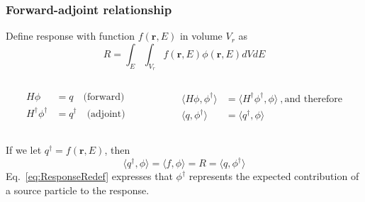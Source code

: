 \documentclass[xcolor=x11names,compress]{beamer}
\renewcommand{\(}{\begin{columns}}
\renewcommand{\)}{\end{columns}}
\newcommand{\<}[1]{\begin{column}{#1}}
\renewcommand{\>}{\end{column}}
\newcommand{\ve}[1]{\ensuremath{\mathbf{#1}}}
\begin{document}
\begin{frame}[fragile]
  \frametitle{Forward-adjoint relationship}
Define response with function $f(\ve{r}, E)$ in volume $V_r$ as
%
\begin{equation}
 R = \int_E \int_{V_r} f(\ve{r}, E) \phi(\ve{r}, E) dV dE 
 \label{eq:Response}
\end{equation}\pause
%
\begin{columns}
  \begin{column}{0.5\textwidth}
	\begin{align}
  	H\phi &= q \quad \text{(forward)}\nonumber \\
  	H^{\dagger} \phi^{\dagger} &= q^{\dagger} \quad 
  	\text{(adjoint)}\nonumber
  	\end{align}
  \end{column}
  \begin{column}{0.5\textwidth}
  	\begin{align}
  	\langle H\phi, \phi^{\dagger} \rangle &= \langle H^{\dagger} \phi^{\dagger}, \phi \rangle \:, \text{and therefore} \nonumber \\
  	\langle q, \phi^{\dagger} \rangle &= \langle q^{\dagger}, \phi \rangle \nonumber
  	\end{align}
  \end{column}
\end{columns}
\vspace*{1 em}
\pause
If we let $q^{\dagger} = f(\ve{r}, E)$, then
%
\begin{equation}
 \langle q^{\dagger}, \phi \rangle = \langle f, \phi \rangle = R = \langle q, \phi^{\dagger} \rangle
 \label{eq:ResponseRedef}
\end{equation}
%
Eq.\ \eqref{eq:ResponseRedef} expresses that $\phi^{\dagger}$ represents the expected contribution of a source particle to the response.

\end{frame}
\end{document}
